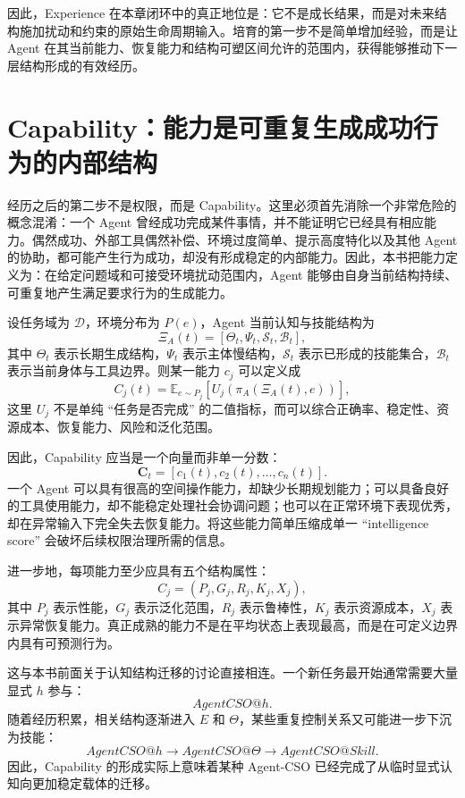 因此，Experience 在本章闭环中的真正地位是：它不是成长结果，而是对未来结构施加扰动和约束的原始生命周期输入。培育的第一步不是简单增加经验，而是让 Agent 在其当前能力、恢复能力和结构可塑区间允许的范围内，获得能够推动下一层结构形成的有效经历。

\section{Capability：能力是可重复生成成功行为的内部结构}

经历之后的第二步不是权限，而是 Capability。这里必须首先消除一个非常危险的概念混淆：一个 Agent 曾经成功完成某件事情，并不能证明它已经具有相应能力。偶然成功、外部工具偶然补偿、环境过度简单、提示高度特化以及其他 Agent 的协助，都可能产生行为成功，却没有形成稳定的内部能力。因此，本书把能力定义为：在给定问题域和可接受环境扰动范围内，Agent 能够由自身当前结构持续、可重复地产生满足要求行为的生成能力。

设任务域为 $\mathcal D$，环境分布为 $P(e)$，Agent 当前认知与技能结构为
\[
\Xi_A(t)
=
[
\Theta_t,
\Psi_t,
\mathcal S_t,
\mathcal B_t
],
\]
其中 $\Theta_t$ 表示长期生成结构，$\Psi_t$ 表示主体慢结构，$\mathcal S_t$ 表示已形成的技能集合，$\mathcal B_t$ 表示当前身体与工具边界。则某一能力 $c_j$ 可以定义成
\[
C_j(t)
=
\mathbb E_{e\sim P_j}
\left[
U_j(
\pi_A(\Xi_A(t),e)
)
\right],
\]
这里 $U_j$ 不是单纯 ``任务是否完成'' 的二值指标，而可以综合正确率、稳定性、资源成本、恢复能力、风险和泛化范围。

因此，Capability 应当是一个向量而非单一分数：
\[
\mathbf C_t
=
[
c_1(t),
c_2(t),
\ldots,
c_n(t)
].
\]
一个 Agent 可以具有很高的空间操作能力，却缺少长期规划能力；可以具备良好的工具使用能力，却不能稳定处理社会协调问题；也可以在正常环境下表现优秀，却在异常输入下完全失去恢复能力。将这些能力简单压缩成单一 ``intelligence score'' 会破坏后续权限治理所需的信息。

进一步地，每项能力至少应具有五个结构属性：
\[
C_j
=
(
P_j,
G_j,
R_j,
K_j,
X_j
),
\]
其中 $P_j$ 表示性能，$G_j$ 表示泛化范围，$R_j$ 表示鲁棒性，$K_j$ 表示资源成本，$X_j$ 表示异常恢复能力。真正成熟的能力不是在平均状态上表现最高，而是在可定义边界内具有可预测行为。

这与本书前面关于认知结构迁移的讨论直接相连。一个新任务最开始通常需要大量显式 $h$ 参与：
\[
AgentCSO@h.
\]
随着经历积累，相关结构逐渐进入 $E$ 和 $\Theta$，某些重复控制关系又可能进一步下沉为技能：
\[
AgentCSO@h
\rightarrow
AgentCSO@\Theta
\rightarrow
AgentCSO@Skill.
\]
因此，Capability 的形成实际上意味着某种 Agent-CSO 已经完成了从临时显式认知向更加稳定载体的迁移。


